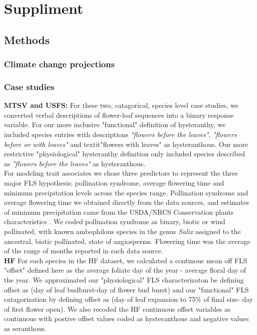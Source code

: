 \documentclass[12pt]{article}\usepackage[]{graphicx}\usepackage[]{color}
\begin{document}
\pagebreak


\section*{Suppliment}
\subsection*{Methods}
\subsubsection*{Climate change projections}
\subsubsection*{Case studies}
\indent\indent \textbf{MTSV and USFS:} For these two, catagorical, species level case studies, we converted verbal descriptions of flower-leaf sequences into a binary response variable. For our more inclusive "functional" definition of hysteranthy, we included species entries with descriptions \textit{"flowers before the leaves"}, \textit{"flowers before or with leaves"} and textit{"flowers with leaves"} as hysteranthous. Our more restrictive "physiological" hysteranthy definition only included species described as \textit{"flowers before the leaves"} as hysteranthous.\\
\ident For modeling trait associates we chose three predictors to represent the three major FLS hypothesis; pollination syndrome, average flowering time and minimum precipitation levels across the species range. Pollination syndrome and average flowering time we obtained directly from the data sources, and estimates of minimum precipitation came from the USDA/NRCS Conservation plants characteristics \citep{}. We coded pollination syndrome as binary, biotic or wind pollinated, with known ambophilous species in the genus \textit{Salix} assigned to the ancestral, biotic pollinated, state of angiosperms. Flowering time was the average of the range of months reported in each data source.\\
\indent \textbf{HF} For each species in the HF dataset, we calculated a continous mean off FLS "offset" defined here as the average foliate day of the year - average floral day of the year. We approximated our "physiological" FLS characterizaton be defining offset as (day of leaf budburst-day of flower bud burst) and our "functional" FLS catagorization by defining offset as (day of leaf expansion to 75\% of final size- day of first flower open). We also recoded the HF continuous offset variables as continuous with postive offset values coded as hysteranthous and negative values as seranthous.\\
\end{document}
